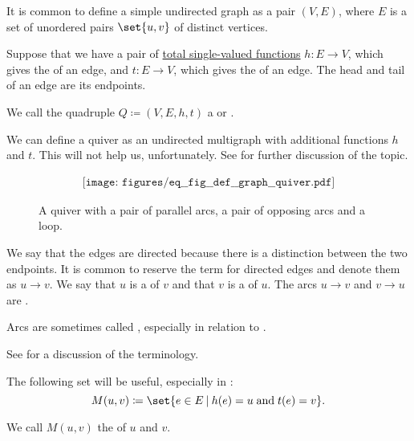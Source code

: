 \begin{definition}
\begin{thmenum}[series=def:graph]
    It is common to define a simple undirected graph as a pair \( (V, E) \), where \( E \) is a set of unordered pairs \( \set{ u, v } \) of distinct vertices.

     Suppose that we have a pair of \hyperref[def:function]{total single-valued functions} \( h: E \to V \), which gives the  of an edge, and \( t: E \to V \), which gives the  of an edge. The head and tail of an edge are its endpoints.

    We call the quadruple \( Q \coloneqq (V, E, h, t) \) a  or .

    We can define a quiver as an undirected multigraph with additional functions \( h \) and \( t \). This will not help us, unfortunately. See  for further discussion of the topic.

    \begin{figure}[h]
      \begin{equation}\label{eq:fig:def:graph/quiver}
        \begin{aligned}
          \texttt{[image: figures/eq\_\_fig\_\_def\_\_graph\_\_quiver.pdf]}
        \end{aligned}
      \end{equation}
      \caption{A quiver with a pair of parallel arcs, a pair of opposing arcs and a loop.}\label{fig:def:graph/quiver}
    \end{figure}

    We say that the edges are directed because there is a distinction between the two endpoints. It is common to reserve the term  for directed edges and denote them as \( u \to v \). We say that \( u \) is a  of \( v \) and that \( v \) is a  of \( u \). The arcs \( u \to v \) and \( v \to u \) are .

    Arcs are sometimes called , especially in relation to .

    See  for a discussion of the terminology.

    The following set will be useful, especially in :
    \begin{equation}\label{eq:def:graph/quiver/arc_set}
      M(u, v) \coloneqq \set{ e \in E \given h(e) = u \T{and} t(e) = v }.
    \end{equation}

    We call \( M(u, v) \) the  of \( u \) and \( v \).


\end{thmenum}
\end{definition}
